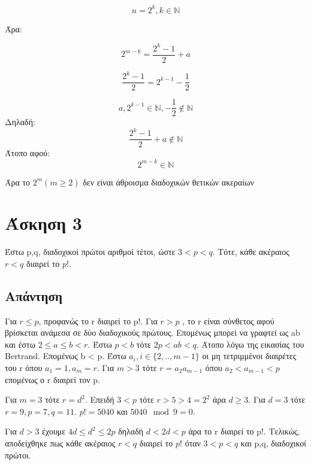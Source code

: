 \documentclass[12pt]{article}
\begin{document}
\[
n = 2^k, k \in \mathbb{N}
\]

Άρα:

\[
2^{m-k} = \frac{2^k-1}{2} +a
\]

\[
\frac{2^k-1}{2} = 2^{k-1} - \frac{1}{2}
\]

\[
a, 2^{k-1} \in \mathbb{N} , -\frac{1}{2} \notin \mathbb{N}
\]
Δηλαδή:
\[
\frac{2^k-1}{2} +a \notin \mathbb{N}
\]
Άτοπο αφού:
\[
2^{m-k} \in \mathbb{N}
\]

Άρα το \( 2^m (m \ge 2) \) δεν είναι άθροισμα διαδοχικών θετικών ακεραίων
\hfill \blacksquare

\section*{Άσκηση 3}

Έστω p,q, διαδοχικοί πρώτοι αριθμοί τέτοι, ώστε \( 3 < p < q\). Τότε, κάθε ακέραιος \( r < q \) διαιρεί το \( p!\).

\subsection*{Απάντηση}
Για \( r \le p \), προφανώς το r διαιρεί το p!. 
\newline
\newline
Για \( r > p \) , το r είναι σύνθετος αφού βρίσκεται ανάμεσα σε δύο διαδοχικούς πρώτους. Επομένως μπορεί να γραφτεί ως ab και έστω \( 2 \le a \le b <r \).
\newline
\newline
Έστω \( p < b\) τότε \( 2p < ab < q\). Άτοπο λόγω της εικασίας του Bertrand. Επομένως b < p.
\newline
\newline
Έστω \( a_i, i \in \{2,..,m-1\} \) οι μη τετριμμένοι διαιρέτες του r όπου \( a_1 = 1, a_m = r \). 
\newline
\newline
Για \( m > 3 \) τότε \( r = a_2 a_{m-1} \) όπου \( a_2<a_{m-1}<p\) επομένως ο r διαιρεί τον p.

Για \( m = 3 \)
τότε \( r = d^2\). Επειδή \( 3 < p\) τότε \(r > 5 > 4 = 2^2\) άρα \( d \ge 3 \). 
\newline
\newline
Για \(d = 3\) τότε \( r = 9, p = 7, q = 11\). \( p! = 5040\) και \( 5040 \mod 9 = 0\). 

Για \( d > 3\) έχουμε \(4d \le d^2 \le 2p\) δηλαδή \(  d< 2d < p \) άρα το r διαιρεί το p!.
\newline
\newline
Τελικώς, αποδείχθηκε πως κάθε ακέραιος \( r < q \) διαιρεί το \( p!\) όταν \( 3 < p < q\) και p,q, διαδοχικοί πρώτοι.
\hfill \blacksquare
\end{document}
